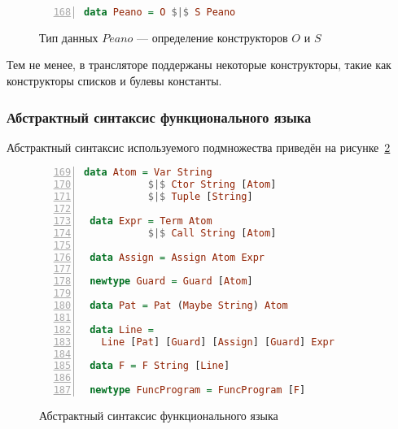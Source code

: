 \begin{figure}[h!]
  \begin{center}
  \begin{minipage}{0.5\textwidth}
  \begin{lstlisting}[language=Haskell, frame=single, numbers=left,numberstyle=\small, firstnumber=168, escapechar=|]
 data Peano = O $|$ S Peano
    \end{lstlisting}
  \end{minipage}
  \end{center}
  \caption{Тип данных $Peano$ --- определение конструкторов $O$ и $S$}
  \label{lst:peano}
\end{figure}

Тем не менее, в трансляторе поддержаны некоторые конструкторы, такие как конструкторы списков и булевы константы.


\subsubsection{Абстрактный синтаксис функционального языка}

Абстрактный синтаксис используемого подмножества \haskell{} приведён на рисунке~\ref{lst:funcast}

\begin{figure}[h!]
  \begin{center}
  \begin{minipage}{0.9\textwidth}
  \begin{lstlisting}[language=Haskell, frame=single, numbers=left,numberstyle=\small, firstnumber=169, escapechar=|]
 data Atom = Var String
           $|$ Ctor String [Atom]
           $|$ Tuple [String]

 data Expr = Term Atom
           $|$ Call String [Atom]

 data Assign = Assign Atom Expr

 newtype Guard = Guard [Atom]

 data Pat = Pat (Maybe String) Atom

 data Line =
   Line [Pat] [Guard] [Assign] [Guard] Expr

 data F = F String [Line]

 newtype FuncProgram = FuncProgram [F]
    \end{lstlisting}
  \end{minipage}
  \end{center}
  \caption{Абстрактный синтаксис функционального языка}
  \label{lst:funcast}
\end{figure}

